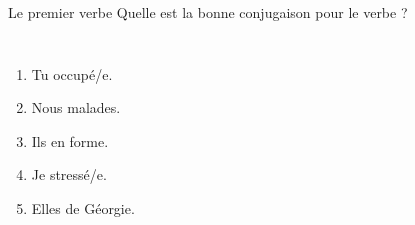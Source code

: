 \begin{frame}{Le premier verbe }
  Quelle est la bonne conjugaison pour le verbe ? \\
  \begin{columns}
      \begin{enumerate}
        \item Tu \underline{} occupé/e.
        \item Nous \underline{} malades.
        \item Ils \underline{} en forme.
        \item Je \underline{} stressé/e.
        \item Elles \underline{} de Géorgie.
      \end{enumerate}
      \begin{minipage}[c][0.6\textheight]{\linewidth}
        \begin{center}
        \end{center}
      \end{minipage}
  \end{columns}
\end{frame}